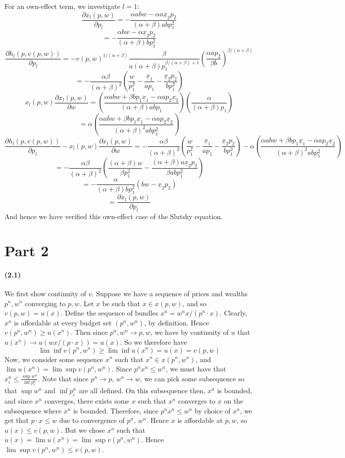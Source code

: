 \documentclass[10pt,letter]{article}
\begin{document}
For an own-effect term, we investigate $l=1$:
\[\frac{\partial x_l(p,w)}{\partial p_l} = -\frac{\alpha abw  -  \alpha a\underline{x}_2p_2 }{(\alpha+\beta)abp_1^2}\]
\[ = -\frac{\alpha bw  -  \alpha \underline{x}_2p_2 }{(\alpha+\beta)bp_1^2} \]
\[ \frac{\partial h_l(p, v(p,w))}{\partial p_l} = -v(p,w)^{1/(\alpha+\beta)}\frac{\beta}{a(\alpha+\beta)p_1^{\beta/(\alpha+\beta)+1}}\left( \frac{ \alpha a p_2}{\beta b} \right)^{\beta/(\alpha + \beta)} \]
\[ = - \frac{\alpha \beta}{(\alpha+\beta)^2}\left(\frac{w}{p_1^2} -\frac{ \underline{x}_1}{ap_1}- \frac{\underline{x}_2p_2}{bp_1^2} \right)\]
\[ x_l(p,w)\frac{\partial x_l(p,w)}{\partial w} = \left(\frac{\alpha ab w + \beta b p_1 \underline{x}_1 - \alpha a p_2 \underline{x}_2}{(\alpha + \beta)abp_1}\right)\left(\frac{\alpha}{(\alpha + \beta)p_1}\right)\]
\[ = \alpha \left(\frac{\alpha ab w + \beta b p_1 \underline{x}_1 - \alpha a p_2 \underline{x}_2}{(\alpha + \beta)^2abp_1^2}\right) \]
\[ \frac{\partial h_l(p, v(p,w))}{\partial p_l} - x_l(p,w)\frac{\partial x_l(p,w)}{\partial w} = - \frac{\alpha \beta}{(\alpha+\beta)^2}\left(\frac{w}{p_1^2} -\frac{ \underline{x}_1}{ap_1}- \frac{\underline{x}_2p_2}{bp_1^2} \right) - \alpha \left(\frac{\alpha ab w + \beta b p_1 \underline{x}_1 - \alpha a p_2 \underline{x}_2}{(\alpha + \beta)^2abp_1^2}\right)\]
\[= - \frac{\alpha \beta}{(\alpha+\beta)^2}\left(\frac{(\alpha+\beta)w}{\beta p_1^2} - \frac{(\alpha+\beta)a\underline{x}_2p_2}{\beta abp_1^2}  \right)\]
\[= - \frac{\alpha }{(\alpha+\beta)b p_1^2}\left(bw- \underline{x}_2p_2  \right)\]
\[= \frac{\partial x_l(p,w)}{\partial p_l}\]
And hence we have verified this own-effect case of the Slutsky equation.
\pagebreak
\section*{Part 2}
\paragraph{(2.1)}
We first show continuity of $v$. Suppose we have a sequence of prices and wealths $p^n, w^n$ converging to $p, w$. Let $x$ be such that $x \in x(p,w)$, and so $v(p,w) = u(x)$. Define the sequence of bundles $x^n = w^n x / (p^n \cdot x)$. Clearly, $x^n$ is affordable at every budget set $(p^n, w^n)$, by definition. Hence $v(p^n, w^n) \ge u(x^n)$. Then since $p^n, w^n \to p, w$, we have by continuity of $u$ that $u(x^n) \to u(wx/(p\cdot x)) = u(x)$. So we therefore have
\[ \lim \inf v(p^n, w^n) \ge \lim \inf u(x^n) = u(x) = v(p,w) \]
Now, we consider some sequence $x^n$ such that $x^n \in x(p^n, w^n)$, and $\lim u(x^n) = \lim \sup v(p^n, w^n)$. Since $p^n x^n \le w^n$, we must have that $x^n_i \le \frac{\sup w^n}{\inf p^n_i}$. Note that since $p^n \to p$, $w^n \to w$, we can pick some subsequence so that $\sup w^n$ and $\inf p^n_i$ are all defined. On this subsequence then, $x^n$ is bounded, and since $x^n$ converges, there exists some $x$ such that $x^n$ converges to $x$ on the subsequence where $x^n$ is bounded. Therefore, since $p^n x^n \le w^n$ by choice of $x^n$, we get that $p \cdot x \le w$ due to convergence of $p^n$, $w^n$. Hence $x$ is affordable at $p, w$, so $u(x) \le v(p, w)$. But we chose $x^n$ such that $u(x) = \lim u(x^n) = \lim \sup v(p^n, w^n)$. Hence $\lim \sup v(p^n, w^n) \le v(p,w)$.
\end{document}
